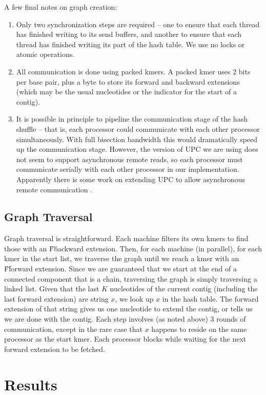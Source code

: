 \documentclass{article}
\begin{document}
A few final notes on graph creation:
\begin{enumerate}
  \item Only two synchronization steps are required -- one to ensure that each thread has finished writing to its send buffers, and another to ensure that each thread has finished writing its part of the hash table.  We use no locks or atomic operations.
  \item All communication is done using packed kmers.  A packed kmer uses 2 bits per base pair, plus a byte to store its forward and backward extensions (which may be the usual nucleotides or the indicator for the start of a contig).
  \item It is possible in principle to pipeline the communication stage of the hash shuffle -- that is, each processor could communicate with each other processor simultaneously.  With full bisection bandwidth this would dramatically speed up the communication stage.  However, the version of UPC we are using does not seem to support asynchronous remote reads, so each processor must communicate serially with each other processor in our implementation.  Apparently there is some work on extending UPC to allow asynchronous remote communication \cite{shet2009asynchronous}.
\end{enumerate}

\subsection{Graph Traversal}
Graph traversal is straightforward.  Each machine filters its own kmers to find those with an \'F\' backward extension.  Then, for each machine (in parallel), for each kmer in the start list, we traverse the graph until we reach a kmer with an \'F\' forward extension.  Since we are guaranteed that we start at the end of a connected component that is a chain, traversing the graph is simply traversing a linked list.  Given that the last $K$ nucleotides of the current contig (including the last forward extension) are string $x$, we look up $x$ in the hash table.  The forward extension of that string gives us one nucleotide to extend the contig, or tells us we are done with the contig.  Each step involves (as noted above) 3 rounds of communication, except in the rare case that $x$ happens to reside on the same processor as the start kmer.  Each processor blocks while waiting for the next forward extension to be fetched.

\section{Results}
\end{document}
